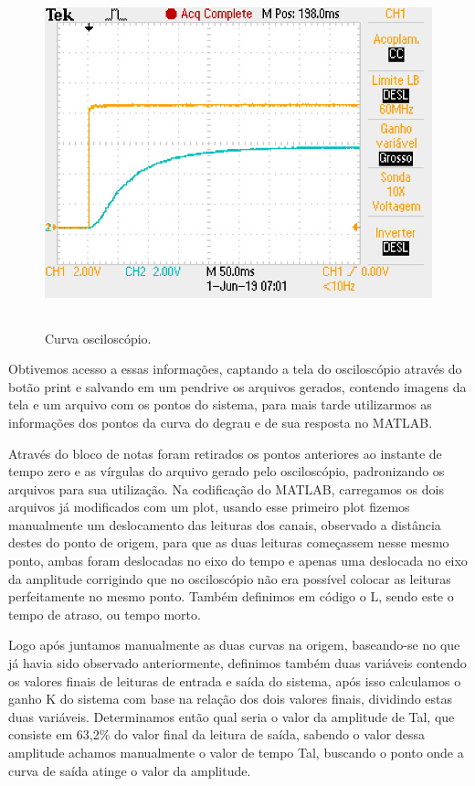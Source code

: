 \documentclass[12pt,a4paper]{article}
\begin{document}
\begin{figure}[H]
    \centering
    \caption{Curva osciloscópio.}
    \label{fig:1}	
    \includegraphics[height=10cm]{figuras/F0003TEK.JPG} %
\end{figure}
    
Obtivemos acesso a essas informações, captando a tela do osciloscópio através do botão print e salvando em um pendrive os arquivos gerados, contendo imagens da tela e um arquivo com os pontos do sistema, para mais tarde utilizarmos as informações dos pontos da curva do degrau e de sua resposta no MATLAB. 

Através do bloco de notas foram retirados os pontos anteriores ao instante de tempo zero e as vírgulas do arquivo gerado pelo osciloscópio, padronizando os arquivos para sua utilização. Na codificação do MATLAB, carregamos os dois arquivos já modificados com um plot, usando esse primeiro plot fizemos manualmente um deslocamento das leituras dos canais, observado a distância destes do ponto de origem, para que as duas leituras começassem nesse mesmo ponto, ambas foram deslocadas no eixo do tempo e apenas uma deslocada no eixo da amplitude corrigindo que no osciloscópio não era possível colocar as leituras perfeitamente no mesmo ponto. Também definimos em código o L, sendo este o tempo de atraso, ou tempo morto.

Logo após juntamos manualmente as duas curvas na origem, baseando-se no que já havia sido observado anteriormente, definimos também duas variáveis contendo os valores finais de leituras de entrada e saída do sistema, após isso calculamos o ganho K do sistema com base na relação dos dois valores finais, dividindo estas duas variáveis. Determinamos então qual seria o valor da amplitude de Tal, que consiste em 63,2\% do valor final da leitura de saída, sabendo o valor dessa amplitude achamos manualmente o valor de tempo Tal, buscando o ponto onde a curva de saída atinge o valor da amplitude.
\end{document}
